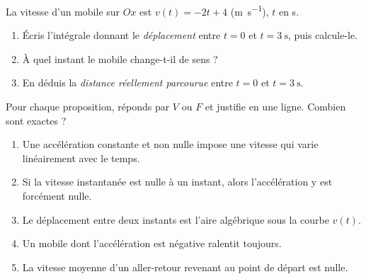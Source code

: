 \documentclass[11pt,a4paper]{article}
\begin{document}
\begin{exo}
La vitesse d'un mobile sur $Ox$ est $v(t)=-2t+4$ (\si{\metre\per\second}), $t$ en \si{\second}.
\begin{enumerate}[label=\alph*)]
  \item Écris l'intégrale donnant le \emph{déplacement} entre $t=0$ et $t=\qty{3}{\second}$, puis calcule-le.
  \item À quel instant le mobile change-t-il de sens ?
  \item En déduis la \emph{distance réellement parcourue} entre $t=0$ et $t=\qty{3}{\second}$.
\end{enumerate}
\end{exo}

\begin{exo}
Pour chaque proposition, réponds par $V$ ou $F$ et justifie en une ligne. Combien sont exactes ?
\begin{enumerate}[label=\alph*)]
  \item Une accélération constante et non nulle impose une vitesse qui varie linéairement avec le temps.
  \item Si la vitesse instantanée est nulle à un instant, alors l'accélération y est forcément nulle.
  \item Le déplacement entre deux instants est l'aire algébrique sous la courbe $v(t)$.
  \item Un mobile dont l'accélération est négative ralentit toujours.
  \item La vitesse moyenne d'un aller-retour revenant au point de départ est nulle.
\end{enumerate}
\end{exo}
\end{document}
